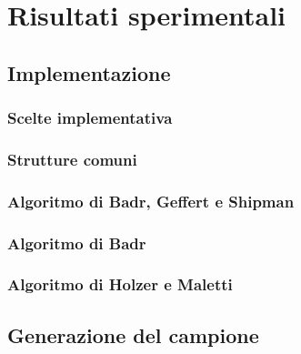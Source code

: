 \documentclass[a4paper,12pt,twoside,openright]{report}
\begin{document}


\chapter{Risultati sperimentali}

\section{Implementazione}

\subsection{Scelte implementativa}

\subsection{Strutture comuni}

\subsection{Algoritmo di Badr, Geffert e Shipman}

\subsection{Algoritmo di Badr}

\subsection{Algoritmo di Holzer e Maletti}

\section{Generazione del campione}
\end{document}
